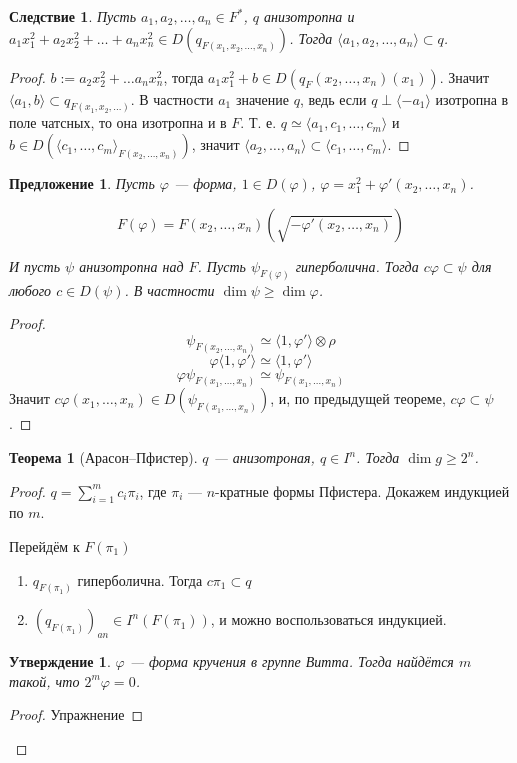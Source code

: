 \documentclass{article}
\newenvironment{enum}[2][\parindent]{\begin{enumerate}[nosep, wide, labelindent = #1, label = #2]}{\end{enumerate}}
\newtheorem*{theorem}{Теорема}
\newtheorem*{corollary}{Следствие}
\newtheorem*{statement}{Утверждение}
\newtheorem*{proposition}{Предложение}
\theoremstyle{definition}
\theoremstyle{remark}
\begin{document}
\begin{corollary}
    Пусть $a_1, a_2, \ldots, a_n \in F^*$, $q$ анизотропна и $a_1x_1^2 + a_2x_2^2 + \ldots + a_nx_n^2 \in D(q_{F(x_1, x_2, \ldots, x_n)})$. Тогда $\langle a_1, a_2, \ldots, a_n \rangle \subset q$.
\end{corollary}
\begin{proof}
    $b := a_2x_2^2 + \ldots a_nx_n^2$, тогда $a_1x_1^2 + b \in D(q_F(x_2, \ldots, x_n)(x_1))$. Значит $\langle a_1, b \rangle \subset q_{F(x_1, x_2, \ldots)}$. В частности $a_1$ значение $q$, ведь если $q \perp \langle -a_1 \rangle$ изотропна в поле чатсных, то она изотропна и в $F$. Т. е. $q \simeq \langle a_1, c_1, \ldots, c_m \rangle$ и $b \in D(\langle c_1, \ldots, c_m \rangle_{F(x_2, \ldots, x_n)})$, значит $\langle a_2, \ldots, a_n \rangle \subset \langle c_1, \ldots, c_m \rangle$.
\end{proof}

\begin{proposition}
Пусть $\varphi$ --- форма, $1 \in D(\varphi)$, $\varphi = x_1^2 + \varphi'(x_2, \ldots, x_n)$.

$$F(\varphi) = F(x_2, \ldots, x_n)(\sqrt{-\varphi'(x_2, \ldots, x_n)})$$

И пусть $\psi$ анизотропна над $F$. Пусть $\psi_{F(\varphi)}$ гиперболична. Тогда $c \varphi \subset \psi$ для любого $c \in D(\psi)$. В частности $\dim \psi \geq \dim \varphi$. 
\end{proposition}
\begin{proof}
    $$\psi_{F(x_2, \ldots, x_n)} \simeq \langle 1, \varphi' \rangle \otimes \rho$$
    $$\varphi \langle 1, \varphi' \rangle \simeq \langle 1, \varphi' \rangle$$
    $$\varphi \psi_{F(x_1, \ldots, x_n)} \simeq \psi_{F(x_1, \ldots, x_n)}$$
    Значит $c\varphi(x_1, \ldots, x_n) \in D(\psi_{F(x_1, \ldots, x_n)})$, и, по предыдущей теореме, $c\varphi \subset \psi$.
\end{proof}

\begin{theorem}[Арасон--Пфистер]
    $q$ --- анизотроная, $q \in I^n$. Тогда $\dim g \geq 2^n$.
\end{theorem}
\begin{proof}
    $q = \sum_{i = 1}^m c_i \pi_i$, где $\pi_i$ --- $n$-кратные формы Пфистера. Докажем индукцией по $m$.

    Перейдём к $F(\pi_1)$

    \begin{enum}{\arabic*)}
        \item $q_{F(\pi_1)}$ гиперболична. Тогда $c\pi_1 \subset q$
        \item $(q_{F(\pi_1)})_{an} \in I^n(F(\pi_1))$, и можно воспользоваться индукцией.
    \end{enum}

    \begin{statement}
        $\varphi$ --- форма кручения в группе Витта. Тогда найдётся $m$ такой, что $2^m \varphi = 0$.
    \end{statement}
    \begin{proof}
        Упражнение
    \end{proof}
\end{proof}
\end{document}
